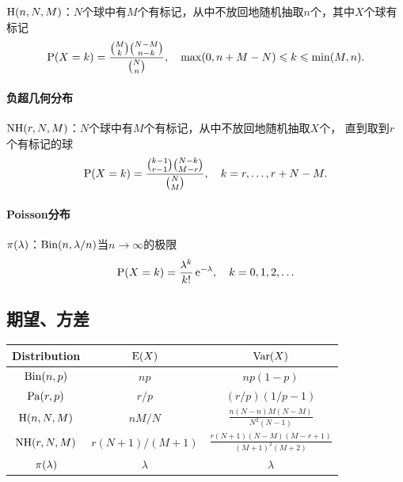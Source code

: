 $\HypergeomDist(n,N,M)$：$N$个球中有$M$个有标记，从中不放回地随机抽取$n$个，其中$X$个球有标记
\begin{equation}
	\P(X = k) = \frac{\binom Mk\binom{N - M}{n - k}}{\binom N n},\quad \max(0,n + M - N) \leqslant k \leqslant \min(M,n).
\end{equation}

\paragraph{负超几何分布}

$\NegHypergeomDist(r,N,M)$：$N$个球中有$M$个有标记，从中不放回地随机抽取$X$个，
直到取到$r$个有标记的球
\begin{equation}
	\P(X = k) = \frac{\binom{k - 1}{r - 1}\binom{N - k}{M - r}}{\binom N M},\quad k = r,\ldots,r + N - M.
\end{equation}

\paragraph{Poisson分布}

$\PoisDist(\lambda)$：$\BinDist(n,\lambda/n)$当$n \to \infty$的极限
\begin{equation}
	\P(X = k) = \frac{\lambda^k}{k!}\e^{-\lambda},\quad k = 0,1,2,\ldots
\end{equation}

\subsection{期望、方差}

\begin{center}
	\begin{tabular}{ccc}
		\toprule
		Distribution&$\E(X)$&$\Var(X)$\\
		\midrule
		$\BinDist(n,p)$&$np$&$np(1 - p)$\\[1ex]
		$\PascalDist(r,p)$&$r/p$&$(r/p)(1/p - 1)$\\[2ex]
		$\HypergeomDist(n,N,M)$&$nM/N$&$\frac{n(N - n)M(N - M)}{N^2(N - 1)}$\\[2ex]
		$\NegHypergeomDist(r,N,M)$&$r(N + 1)/(M + 1)$&$\frac{r(N + 1)(N - M)(M - r + 1)}{(M + 1)^2(M + 2)}$\\
		$\PoisDist(\lambda)$&$\lambda$&$\lambda$\\
		\bottomrule
	\end{tabular}
\end{center}

